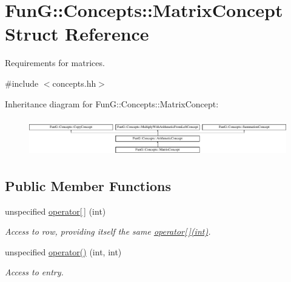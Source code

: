 \hypertarget{structFunG_1_1Concepts_1_1MatrixConcept}{\section{Fun\-G\-:\-:Concepts\-:\-:Matrix\-Concept Struct Reference}
\label{structFunG_1_1Concepts_1_1MatrixConcept}
}


Requirements for matrices.  




{\ttfamily \#include $<$concepts.\-hh$>$}

Inheritance diagram for Fun\-G\-:\-:Concepts\-:\-:Matrix\-Concept\-:\begin{figure}[H]
\begin{center}
\leavevmode
\includegraphics[height=1.661721cm]{structFunG_1_1Concepts_1_1MatrixConcept}
\end{center}
\end{figure}
\subsection*{Public Member Functions}
\begin{DoxyCompactItemize}
\item 
\hypertarget{structFunG_1_1Concepts_1_1MatrixConcept_ad5d89a552a4dc01fc0d06170cca8f00c}{unspecified \hyperlink{structFunG_1_1Concepts_1_1MatrixConcept_ad5d89a552a4dc01fc0d06170cca8f00c}{operator\mbox{[}$\,$\mbox{]}} (int)}\label{structFunG_1_1Concepts_1_1MatrixConcept_ad5d89a552a4dc01fc0d06170cca8f00c}

\begin{DoxyCompactList}\small\item\em Access to row, providing itself the same \hyperlink{structFunG_1_1Concepts_1_1MatrixConcept_ad5d89a552a4dc01fc0d06170cca8f00c}{operator\mbox{[}$\,$\mbox{]}(int)}. \end{DoxyCompactList}\item 
\hypertarget{structFunG_1_1Concepts_1_1MatrixConcept_a9a7fc91f16e1ddc5801c37f2bfd1bf47}{unspecified \hyperlink{structFunG_1_1Concepts_1_1MatrixConcept_a9a7fc91f16e1ddc5801c37f2bfd1bf47}{operator()} (int, int)}\label{structFunG_1_1Concepts_1_1MatrixConcept_a9a7fc91f16e1ddc5801c37f2bfd1bf47}

\begin{DoxyCompactList}\small\item\em Access to entry. \end{DoxyCompactList}\end{DoxyCompactItemize}


